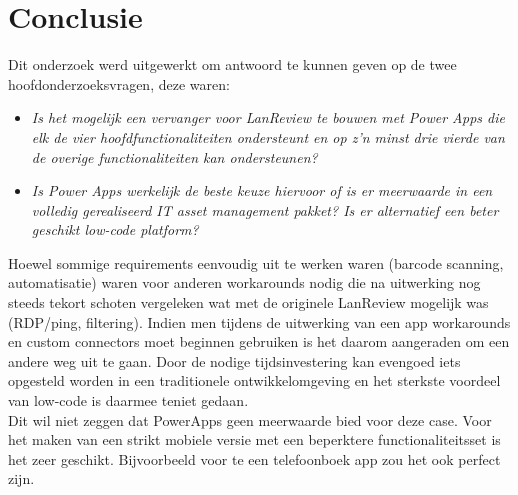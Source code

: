 
\chapter{Conclusie}
\label{ch:conclusie}


Dit onderzoek werd uitgewerkt om antwoord te kunnen geven op de twee hoofdonderzoeksvragen, deze waren:
\begin{itemize}
    \item \textit{Is het mogelijk een vervanger voor LanReview te bouwen met Power Apps die elk de vier hoofdfunctionaliteiten ondersteunt en op z'n minst drie vierde van de overige functionaliteiten kan ondersteunen?}
    \item \textit{Is Power Apps werkelijk de beste keuze hiervoor of is er meerwaarde in een volledig gerealiseerd IT asset management pakket? Is er alternatief een beter geschikt low-code platform?}
\end{itemize}

Hoewel sommige requirements eenvoudig uit te werken waren (barcode scanning, automatisatie) waren voor anderen workarounds nodig die na uitwerking nog steeds tekort schoten vergeleken wat met de originele LanReview mogelijk was (RDP/ping, filtering). Indien men tijdens de uitwerking van een app workarounds en custom connectors moet beginnen gebruiken is het daarom aangeraden om een andere weg uit te gaan. Door de nodige tijdsinvestering kan evengoed iets opgesteld worden in een traditionele ontwikkelomgeving en het sterkste voordeel van low-code is daarmee teniet gedaan.\\
Dit wil niet zeggen dat PowerApps geen meerwaarde bied voor deze case. Voor het maken van een strikt mobiele versie met een beperktere functionaliteitsset is het zeer geschikt. Bijvoorbeeld voor te een telefoonboek app zou het ook perfect zijn.

